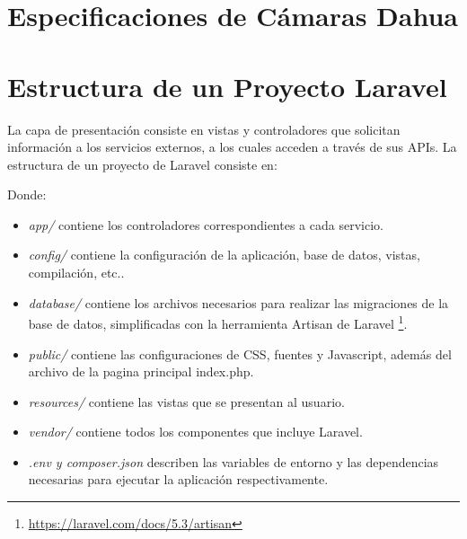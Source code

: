 \newpage
\appendix
\chapter{Especificaciones de Cámaras Dahua}
\label{appendix:dahua}

\appendix
\chapter{Estructura de un Proyecto Laravel}
La capa de presentación consiste en vistas y controladores que solicitan información a los servicios externos, a los cuales acceden a través de sus APIs.
\clearpage
La estructura de un proyecto de Laravel consiste en:

\vspace{0.5cm}
Donde:

\begin{itemize}
\item \textit{app/} contiene los controladores correspondientes a cada servicio.
\item \textit{config/} contiene la configuración de la aplicación, base de datos, vistas, compilación, etc..
\item \textit{database/} contiene los archivos necesarios para realizar las migraciones de la base de datos, simplificadas con la herramienta Artisan de Laravel \footnote{\url{https://laravel.com/docs/5.3/artisan}}.
\item \textit{public/} contiene las configuraciones de CSS, fuentes y Javascript, además del archivo de la pagina principal index.php.
\item \textit{resources/} contiene las vistas que se presentan al usuario.
\item \textit{vendor/} contiene todos los componentes que incluye Laravel.
\item \textit{.env y composer.json} describen las variables de entorno y las dependencias necesarias para ejecutar la aplicación respectivamente.

\end{itemize}